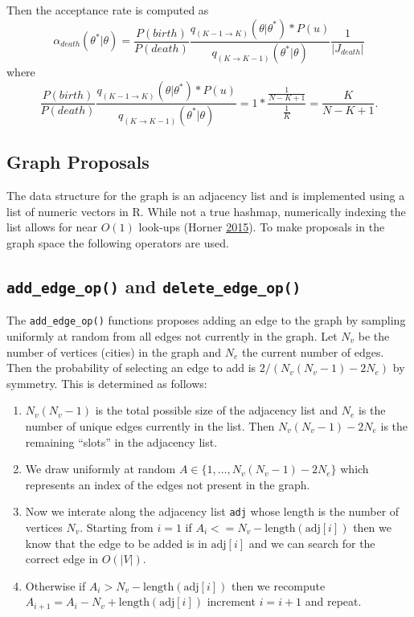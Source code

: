 \documentclass[11pt,a4paper]{article}
\begin{document}
Then the acceptance rate is computed as
\[\alpha_{death}(\theta^*|\theta) = \frac{P(birth)}{P(death)}\frac{q_{(K-1\rightarrow K)}(\theta|\theta^*)*P(u)}{q_{(K\rightarrow K - 1)}(\theta^*|\theta)}\frac{1}{|J_{death}|}\]
where
\[ \frac{P(birth)}{P(death)}\frac{q_{(K-1\rightarrow K)}(\theta|\theta^*)*P(u)}{q_{(K\rightarrow K - 1)}(\theta^*|\theta)} = 1*\frac{\frac{1}{N-K+1}}{\frac{1}{K}} = \frac{K}{N-K+1}.\]

\hypertarget{graph-proposals}{%
\subsection{Graph Proposals}\label{graph-proposals}}

The data structure for the graph is an adjacency list and is implemented
using a list of numeric vectors in R. While not a true hashmap,
numerically indexing the list allows for near \(O(1)\) look-ups (Horner
\protect\hyperlink{ref-horner_hash_2015}{2015}). To make proposals in
the graph space the following operators are used.

\hypertarget{add_edge_op-and-delete_edge_op}{%
\subsection{\texorpdfstring{\texttt{add\_edge\_op()} and
\texttt{delete\_edge\_op()}}{add\_edge\_op() and delete\_edge\_op()}}\label{add_edge_op-and-delete_edge_op}}

The \texttt{add\_edge\_op()} functions proposes adding an edge to the
graph by sampling uniformly at random from all edges not currently in
the graph. Let \(N_v\) be the number of vertices (cities) in the graph
and \(N_e\) the current number of edges. Then the probability of
selecting an edge to add is \(2/(N_v(N_v-1) - 2N_e)\) by symmetry. This
is determined as follows:

\begin{enumerate}
\def\labelenumi{\arabic{enumi}.}
\item
  \(N_v(N_v-1)\) is the total possible size of the adjacency list and
  \(N_e\) is the number of unique edges currently in the list. Then
  \(N_v(N_v-1) - 2N_e\) is the remaining ``slots'' in the adjacency
  list.
\item
  We draw uniformly at random \(A \in \{1,\dots,N_v(N_v-1) - 2N_e\}\)
  which represents an index of the edges not present in the graph.
\item
  Now we interate along the adjacency list \texttt{adj} whose length is
  the number of vertices \(N_v\). Starting from \(i = 1\) if
  \(A_i <= N_v - \text{length}(\text{adj}[i])\) then we know that the
  edge to be added is in \(\text{adj}[i]\) and we can search for the
  correct edge in \(O(|V|)\).
\item
  Otherwise if \(A_i > N_v - \text{length}(\text{adj}[i])\) then we
  recompute \(A_{i+1} = A_i - N_v + \text{length}(\text{adj}[i])\)
  increment \(i = i + 1\) and repeat.
\end{enumerate}
\end{document}
